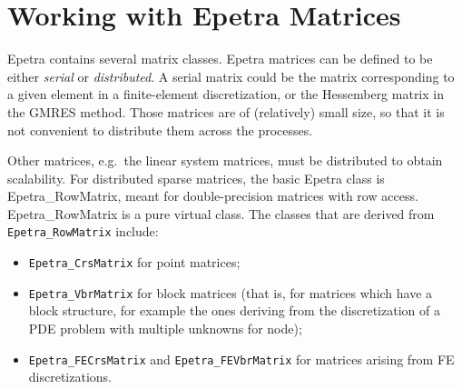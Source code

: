 % 
% 
% 
%  
%  
% 

\section{Working with Epetra Matrices}
\label{chap:epetra_mat}

Epetra contains several matrix classes.  Epetra matrices can be defined
to be either {\em serial} or {\em distributed}. A serial matrix could be
the matrix corresponding to a given element in a finite-element
discretization, or the Hessemberg matrix in the GMRES method. Those
matrices are of (relatively) small size, so that it is not convenient to
distribute them across the processes.

Other matrices, e.g.~the linear system matrices, must be distributed to
obtain scalability.  For distributed sparse matrices, the basic Epetra
class is Epetra\_RowMatrix, meant for double-precision matrices with row
access.  Epetra\_RowMatrix is a pure virtual class.  The classes that
are derived from \verb!Epetra_RowMatrix! include:
\begin{itemize}
\item \verb!Epetra_CrsMatrix! for point matrices;
\item \verb!Epetra_VbrMatrix! for block matrices (that is, for
  matrices which have a block structure, for example the ones deriving
  from the discretization of a PDE problem with multiple unknowns for
  node);
\item \verb!Epetra_FECrsMatrix! and \verb!Epetra_FEVbrMatrix! for
  matrices arising from FE discretizations.
\end{itemize}


